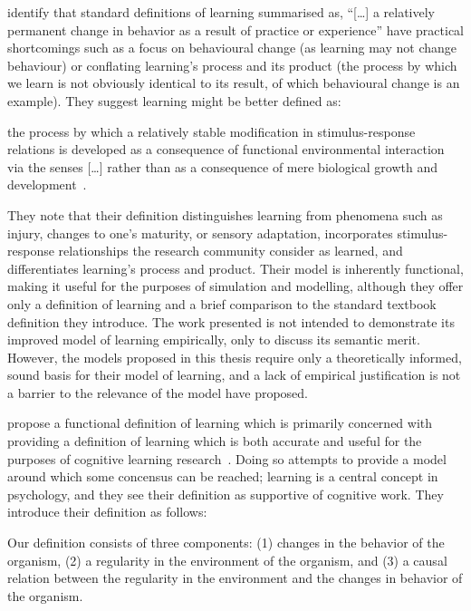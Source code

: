 \citeauthor{lachman1997learning} identify\cite{lachman1997learning} that
standard definitions of learning summarised as, ``[\ldots{}] a
relatively permanent change in behavior as a result of practice or experience''
have practical shortcomings such as a focus on behavioural change (as learning
may not change behaviour) or conflating learning's process and its product (the
process by which we learn is not obviously identical to its result, of which
behavioural change is an example). They suggest learning might be better defined
as:

\begin{displayquote}
[\ldots{}] the process by which a relatively stable modification in
stimulus-response relations is developed as a consequence of functional
environmental interaction via the senses [\ldots{}] rather than as a consequence
of mere biological growth and development~\cite{lachman1997learning}.
\end{displayquote}

They note that their definition distinguishes learning from phenomena such as
injury, changes to one's maturity, or sensory adaptation, incorporates
stimulus-response relationships the research community consider as learned, and
differentiates learning's process and product. Their model is inherently
functional, making it useful for the purposes of simulation and modelling,
although they offer only a definition of learning and a brief comparison to
the standard textbook definition they introduce. The work presented is not
intended to demonstrate its improved model of learning empirically, only to
discuss its semantic merit. However, the models proposed in this thesis require
only a theoretically informed, sound basis for their model of learning, and a
lack of empirical justification is not a barrier to the relevance of the model
\citeauthor{lachman1997learning} have proposed.

\citeauthor{de2013learning} propose a functional definition of learning which is
primarily concerned with providing a definition of learning which is both
accurate and useful for the purposes of cognitive learning
research~\cite{de2013learning}. Doing so attempts to provide a model around
which some concensus can be reached; learning is a central concept in
psychology, and they see their definition as supportive of cognitive work. They
introduce their definition as follows:

\begin{displayquote}
Our definition consists of three components: (1) changes in the behavior of the
organism, (2) a regularity in the environment of the organism, and (3) a causal
relation between the regularity in the environment and the changes in behavior
of the organism.
\end{displayquote}

